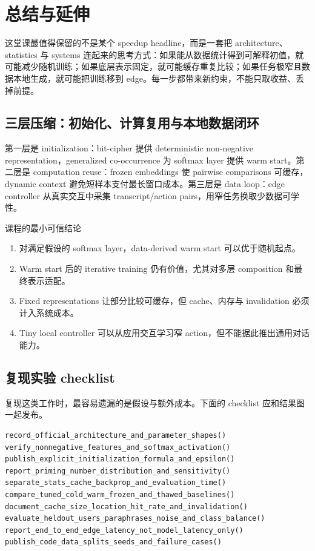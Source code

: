 \section{总结与延伸}

这堂课最值得保留的不是某个 speedup headline，而是一套把 architecture、statistics 与 systems 连起来的思考方式：如果能从数据统计得到可解释初值，就可能减少随机训练；如果底层表示固定，就可能缓存重复比较；如果任务极窄且数据本地生成，就可能把训练移到 edge。每一步都带来新约束，不能只取收益、丢掉前提。

\subsection{三层压缩：初始化、计算复用与本地数据闭环}

第一层是 initialization：bit-cipher 提供 deterministic non-negative representation，generalized co-occurrence 为 softmax layer 提供 warm start。第二层是 computation reuse：frozen embeddings 使 pairwise comparisons 可缓存，dynamic context 避免短样本支付最长窗口成本。第三层是 data loop：edge controller 从真实交互中采集 transcript/action pairs，用窄任务换取少数据可学性。

\begin{importantbox}{课程的最小可信结论}
\begin{enumerate}
  \item 对满足假设的 softmax layer，data-derived warm start 可以优于随机起点。
  \item Warm start 后的 iterative training 仍有价值，尤其对多层 composition 和最终表示适配。
  \item Fixed representations 让部分比较可缓存，但 cache、内存与 invalidation 必须计入系统成本。
  \item Tiny local controller 可以从应用交互学习窄 action，但不能据此推出通用对话能力。
\end{enumerate}
\end{importantbox}

\subsection{复现实验 checklist}

复现这类工作时，最容易遗漏的是假设与额外成本。下面的 checklist 应和结果图一起发布。

\begin{lstlisting}[caption={SAFFU/PLM 复现与发布清单}]
record_official_architecture_and_parameter_shapes()
verify_nonnegative_features_and_softmax_activation()
publish_explicit_initialization_formula_and_epsilon()
report_priming_number_distribution_and_sensitivity()
separate_stats_cache_backprop_and_evaluation_time()
compare_tuned_cold_warm_frozen_and_thawed_baselines()
document_cache_size_location_hit_rate_and_invalidation()
evaluate_heldout_users_paraphrases_noise_and_class_balance()
report_end_to_end_edge_latency_not_model_latency_only()
publish_code_data_splits_seeds_and_failure_cases()
\end{lstlisting}

